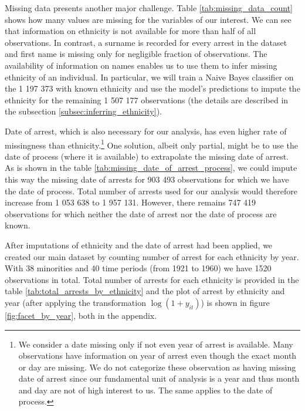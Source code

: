 Missing data presents another major challenge. 
 Table \ref{tab:missing_data_count} shows how many values are missing for the variables of our interest. We can see that information on ethnicity is not available for more than half of all observations. In contrast, a surname is recorded for every arrest in the dataset and first name is missing only for negligible fraction of observations. The availability of information on names enables us to use them to infer missing ethnicity of an individual. In particular, we will train a Naive Bayes classifier on the 1 197 373 with known ethnicity and use the model's predictions to impute the ethnicity for the remaining 1 507 177 observations (the details are described in the subsection \ref{subsec:inferring_ethnicity}).


Date of arrest, which is also necessary for our analysis, has even higher rate of missingness than ethnicity.\footnote{
We consider a date missing only if not even year of arrest is available. Many observations have information on year of arrest even though the exact month or day are missing. We do not categorize these observation as having missing date of arrest since our fundamental unit of analysis is a year and thus month and day are not of high interest to us. The same applies to the date of process.} 
One solution, albeit only partial, might be to use the date of process (where it is available)  to extrapolate the missing date of arrest.
As is shown in the table \ref{tab:missing_date_of_arrest_process}, we could impute this way the missing date of arrests for 903 493 observations for which we have the date of process. 
Total number of arrests used for our analysis would therefore increase from 1 053 638 to  1 957 131.  However, there remains 747 419 observations for which neither the date of arrest nor the date of process are known. 




After imputations of ethnicity and the date of arrest had been applied,  we created our main dataset by counting number of arrest for each ethnicity by year. %
With 38  minorities  and 40 time periods (from 1921 to 1960) we have 1520 observations in total. Total number of arrests for each ethnicity is provided in the table \ref{tab:total_arrests_by_ethnicity} and the plot of arrest by ethnicity and year (after applying the transformation $\log\left(1 + y_{it}\right)$) is shown in figure \ref{fig:facet_by_year}, both in the appendix. 

